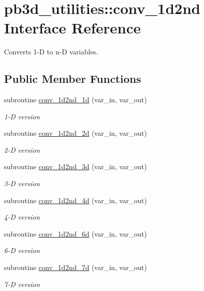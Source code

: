 \hypertarget{interfacepb3d__utilities_1_1conv__1d2nd}{}\section{pb3d\+\_\+utilities\+:\+:conv\+\_\+1d2nd Interface Reference}
\label{interfacepb3d__utilities_1_1conv__1d2nd}


Converts 1-\/D to n-\/D variables.  


\subsection*{Public Member Functions}
\begin{DoxyCompactItemize}
\item 
subroutine \hyperlink{interfacepb3d__utilities_1_1conv__1d2nd_af88c191f205d216cee363ac99956ccdd}{conv\+\_\+1d2nd\+\_\+1d} (var\+\_\+in, var\+\_\+out)
\begin{DoxyCompactList}\small\item\em 1-\/D version \end{DoxyCompactList}\item 
subroutine \hyperlink{interfacepb3d__utilities_1_1conv__1d2nd_ab1ca2d31ce16957592d92074fb9cd06e}{conv\+\_\+1d2nd\+\_\+2d} (var\+\_\+in, var\+\_\+out)
\begin{DoxyCompactList}\small\item\em 2-\/D version \end{DoxyCompactList}\item 
subroutine \hyperlink{interfacepb3d__utilities_1_1conv__1d2nd_afe23e96a8bfccd4911e460ffec0c9666}{conv\+\_\+1d2nd\+\_\+3d} (var\+\_\+in, var\+\_\+out)
\begin{DoxyCompactList}\small\item\em 3-\/D version \end{DoxyCompactList}\item 
subroutine \hyperlink{interfacepb3d__utilities_1_1conv__1d2nd_a9e12d3c7ecb5a3df4d2126f32fb41721}{conv\+\_\+1d2nd\+\_\+4d} (var\+\_\+in, var\+\_\+out)
\begin{DoxyCompactList}\small\item\em 4-\/D version \end{DoxyCompactList}\item 
subroutine \hyperlink{interfacepb3d__utilities_1_1conv__1d2nd_a26b4bd002ccd9eb3babda612fc6c7e60}{conv\+\_\+1d2nd\+\_\+6d} (var\+\_\+in, var\+\_\+out)
\begin{DoxyCompactList}\small\item\em 6-\/D version \end{DoxyCompactList}\item 
subroutine \hyperlink{interfacepb3d__utilities_1_1conv__1d2nd_a4a8dc98820f4502e373657b494533655}{conv\+\_\+1d2nd\+\_\+7d} (var\+\_\+in, var\+\_\+out)
\begin{DoxyCompactList}\small\item\em 7-\/D version \end{DoxyCompactList}\end{DoxyCompactItemize}


